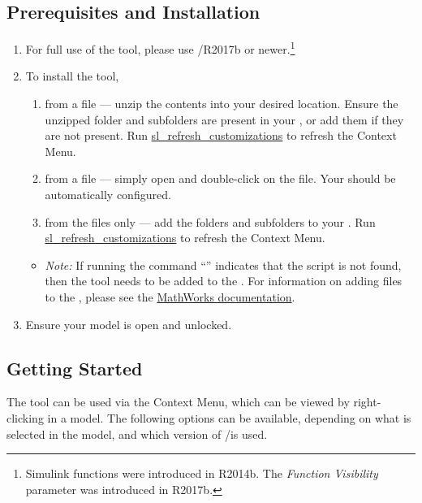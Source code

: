 \documentclass{article}
\begin{document}
\subsection{Prerequisites and Installation}

\begin{enumerate}
\item For full use of the tool, please use \matlab/\Simulink R2017b or newer.\footnote{Simulink functions were introduced in R2014b. The \emph{Function Visibility} parameter was introduced in R2017b.}

\item To install the tool,
	\begin{enumerate}
		\item from a  file --- unzip the contents into your desired location. Ensure the unzipped folder and subfolders are present in your \mpath, or add them if they are not present. Run \href{https://www.mathworks.com/help/simulink/ug/registering-customizations.html}{sl\_refresh\_customizations} to refresh the Context Menu. 
		\item from a  file --- simply open \Matlab and double-click on the file. Your \mpath should be automatically configured.
		\item from the files only --- add the folders and subfolders to your \mpath. Run \href{https://www.mathworks.com/help/simulink/ug/registering-customizations.html}{sl\_refresh\_customizations} to refresh the Context Menu.
	\end{enumerate}
	\begin{itemize}
		\item \textit{Note:} If running the command ``'' indicates that the script is not found, then the tool needs to be added to the \mpath.
		For information on adding files to the \mpath, please see the \href{https://www.mathworks.com/help/matlab/matlab_env/add-remove-or-reorder-folders-on-the-search-path.html}{MathWorks documentation}.
	\end{itemize}
\item Ensure your model is open and unlocked.
\end{enumerate}

\subsection{Getting Started}
The tool can be used via the \Simulink Context Menu, which can be viewed by right-clicking in a model. The following options can be available, depending on what is selected in the model, and which version of \Matlab/\Simulink is used.
\end{document}
